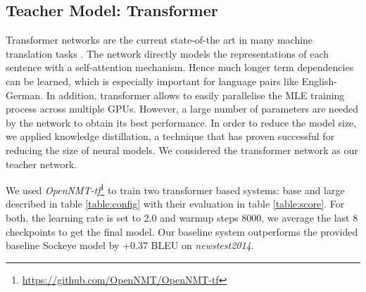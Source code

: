 \documentclass[11pt,a4paper]{article}
\begin{document}
\subsection{Teacher Model: Transformer}
\label{transformer}

Transformer networks \cite{vaswani2017attention} are the current state-of-the art in many machine translation tasks \cite{DBLP:journals/corr/abs-1803-02155}.
The network directly models the representations of each sentence
with a self-attention mechanism.  Hence much longer term dependencies
can be learned, which is especially important for language pairs like
English-German.
In addition, transformer allows to easily parallelise the MLE training process across multiple GPUs.
However, a large number of parameters are needed by the network to obtain its best performance.
In order to reduce the model size, we applied knowledge distillation, a technique that has proven successful for reducing the size of neural models. We considered the transformer network as our teacher network.



We used \textit{OpenNMT-tf}\footnote{\url{https://github.com/OpenNMT/OpenNMT-tf}}
to train two transformer based systems: base and large described in
table \ref{table:config} with their evaluation in table \ref{table:score}. For both, the
learning rate is set to 2.0 and warmup steps 8000, we average the last
8 checkpoints to get the final model. Our baseline system outperforms
the provided baseline Sockeye model by +0.37 BLEU on {\it newstest2014}.
\end{document}
